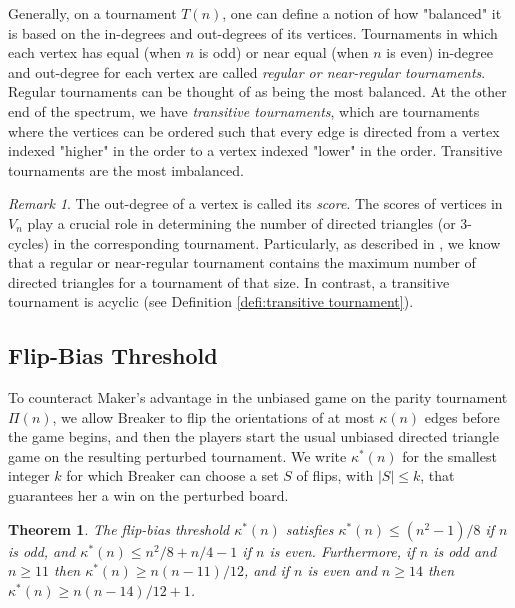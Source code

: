 \documentclass{article}
\theoremstyle{definition}
\theoremstyle{plain}
\newtheorem{theo}{Theorem}[section]
\theoremstyle{remark}
\newtheorem{rem}{Remark}[section]
\theoremstyle{definition}
\begin{document}
Generally, on a tournament $T(n)$, one can define a notion of how "balanced" it is based on the in-degrees and out-degrees of its vertices. Tournaments in which each vertex has equal (when $n$ is odd) or near equal (when $n$ is even) in-degree and out-degree for each vertex are called \emph{regular or near-regular tournaments}. Regular tournaments can be thought of as being the most balanced. At the other end of the spectrum, we have \emph{transitive tournaments}, which are tournaments where the vertices can be ordered such that every edge is directed from a vertex indexed "higher" in the order to a vertex indexed "lower" in the order. Transitive tournaments are the most imbalanced.

\begin{rem}
    The out-degree of a vertex is called its \emph{score}. The scores of vertices in $V_n$ play a crucial role in determining the number of directed triangles (or $3$- cycles) in the corresponding tournament. Particularly, as described in \cite{moon2015topics}, we know that a regular or near-regular tournament contains the maximum number of directed triangles for a tournament of that size. In contrast, a transitive tournament is acyclic (see Definition \ref{defi:transitive tournament}).

\end{rem}


\subsection{Flip-Bias Threshold}\label{subsec:flipbias}

To counteract Maker's advantage in the unbiased game on the parity tournament $\Pi(n)$, we allow Breaker to flip the orientations of at most $\kappa(n)$ edges before the game begins, and then the players start the usual unbiased directed triangle game on the resulting perturbed tournament.
We write $\kappa^*(n)$ for the smallest integer $k$ for which Breaker can choose a set $S$ of flips, with $|S|\le k$, that guarantees her a win on the perturbed board.

\begin{theo}\label{thm:flip-bias}
    The flip-bias threshold $\kappa^*(n)$ satisfies $\kappa^*(n) \le (n^2-1)/8$ if $n$ is odd, and $\kappa^*(n) \le n^2/8+n/4-1$ if $n$ is even.
    Furthermore, if $n$ is odd and $n\ge 11$ then $\kappa^*(n) \ge n(n-11)/12$,
    and if $n$ is even and $n\ge 14$ then $\kappa^*(n) \ge n(n-14)/12 + 1$.
\end{theo}
\end{document}
